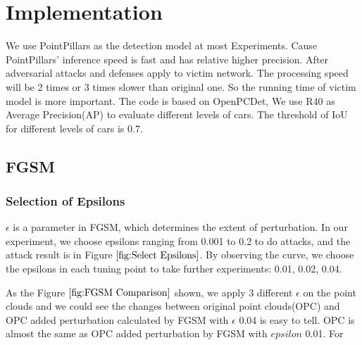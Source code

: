 
\chapter{Implementation}
\label{sec:implementation}
We use PointPillars\cite{lang_pointpillars_2019} as the detection model at most Experiments. Cause PointPillars' inference speed is fast and has relative higher precision. After adversarial attacks and defenses apply to victim network. The processing speed will be 2 times or 3 times slower than original one. So the running time of victim model is more important. The code is based on OpenPCDet\cite{openpcdet2020}, We use R40\cite{simonelli_disentangling_2019} as Average Precision(AP) to evaluate different levels of cars. The threshold of IoU for different levels of cars is 0.7.
\section{FGSM}
\subsection{Selection of Epsilons}

\(\epsilon\) is a parameter in FGSM, which determines the extent of perturbation. In our experiment, we choose epsilons ranging from 0.001 to 0.2 to do attacks, and the attack result is in Figure \(\ref{fig:Select Epsilons}\). By observing the curve, we choose the epsilons in each tuning point to take further experiments: 0.01, 0.02, 0.04. 

As the Figure \(\ref{fig:FGSM Comparison}\) shown, we apply 3 different \(\epsilon\) on the point clouds and we could see the changes between original point clouds(OPC) and OPC added perturbation calculated by FGSM with \(\epsilon\) 0.04 is easy to tell. OPC is almost the same as OPC added perturbation by FGSM with \(epsilon\) 0.01. For  

